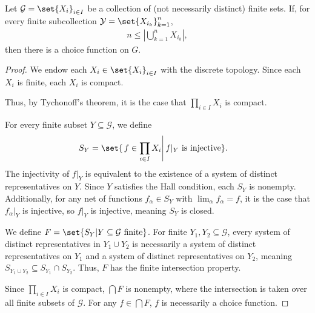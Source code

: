 %
%
\begin{theorem}
  Let $\mathcal{G} = \set{X_{i}}_{i\in I}$ be a collection of (not necessarily distinct) finite sets. If, for every finite subcollection $\mathcal{Y} = \set{X_{i_k}}_{k=1}^{n}$,
  \begin{align*}
    n\leq \left\vert \bigcup_{k=1}^{n}X_{i_k} \right\vert,
  \end{align*}
  then there is a choice function on $G$.
\end{theorem}
\begin{proof}
  We endow each $X_i\in \set{X_{i}}_{i\in I}$ with the discrete topology. Since each $X_i$ is finite, each $X_i$ is compact.\newline

  Thus, by Tychonoff's theorem, it is the case that $\prod_{i\in I}X_{i}$ is compact.\newline

  For every finite subset $Y\subseteq \mathcal{G}$, we define
  \begin{align*}
    S_Y &= \set{\left.f\in \prod_{i\in I}X_i\right|f\vert_{Y}\text{ is injective}}.
  \end{align*}
  The injectivity of $f\vert_{Y}$ is equivalent to the existence of a system of distinct representatives on $Y$. Since $Y$ satisfies the Hall condition, each $S_{Y}$ is nonempty. Additionally, for any net of functions $f_{\alpha}\in S_{Y}$ with $\lim_{\alpha}f_{\alpha} = f$, it is the case that $f_{\alpha}\vert_{Y}$ is injective, so $f\vert_{Y}$ is injective, meaning $S_{Y}$ is closed.\newline

  We define $F = \set{S_{Y}| Y\subseteq \mathcal{G}\text{ finite}}$. For finite $Y_{1},Y_{2}\subseteq \mathcal{G}$, every system of distinct representatives in $Y_1\cup Y_2$ is necessarily a system of distinct representatives on $Y_1$ and a system of distinct representatives on $Y_{2}$, meaning $S_{Y_1\cup Y_2}\subseteq S_{Y_1}\cap S_{Y_2}$. Thus, $F$ has the finite intersection property.\newline

  Since $\prod_{i\in I}X_i$ is compact, $\bigcap F$ is nonempty, where the intersection is taken over all finite subsets of $\mathcal{G}$. For any $f\in \bigcap F$, $f$ is necessarily a choice function.
\end{proof}
